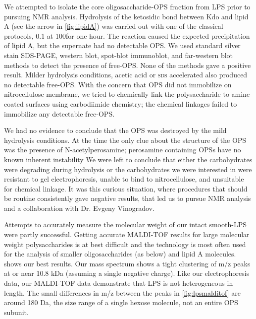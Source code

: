 We attempted to isolate the core oligosaccharide-\ac{OPS} fraction from \caulobacter
\ac{LPS} prior to pursuing \ac{NMR} analysis. Hydrolysis of the ketosidic bond
between Kdo and lipid A (see the arrow in \cref{fig:lipidA}) was carried out
with one of the classical protocols, 0.1 \si{\molar}  at 100\cel for one
hour. The reaction caused the expected precipitation of  lipid A, but the supernate had no detectable \ac{OPS}. We used standard silver stain \ac{SDS-PAGE}, western blot, spot-blot immunoblot, and far-western blot methods to detect the presence of free-\ac{OPS}. None of the methods gave a positive result. Milder hydrolysis conditions, acetic acid or \textsc{sds} accelerated also produced no detectable free-\ac{OPS}. With the concern that \ac{OPS} did not immobilize on nitrocellulose membrane, we tried to chemically link the polysaccharide to amine-coated surfaces using carbodiimide chemistry; the chemical linkages failed to immobilize any detectable free-\ac{OPS}. 

We had no evidence to conclude that the \ac{OPS} was destroyed by the mild hydrolysis conditions. At the time the only clue about the structure of the \ac{OPS} was the presence of N-acetylperosamine; perosamine containing \acp{OPS} have no known inherent instability We were left to conclude that either the carbohydrates were degrading during hydrolysis or the carbohydrates we were interested in were resistant to gel electrophoresis, unable to bind to nitrocellulose, and unsuitable for chemical linkage. It was this curious situation, where procedures that should be routine consistently gave negative results, that led us to pursue \ac{NMR} analysis and a collaboration with Dr. Evgeny Vinogradov.

Attempts  to accurately measure the molecular weight of our intact smooth-\ac{LPS} were partly successful. Getting accurate \ac{MALDI-TOF} results for large molecular weight polysaccharides is at best difficult and the technology is most often used for the analysis of smaller oligosaccharides (as below) and lipid A molecules.  shows our best results. Our mass spectrum shows a tight clustering of m/z peaks at or near 10.8 kDa (assuming a single negative charge). Like our electrophoresis data, our \ac{MALDI-TOF} data demonstrate that \caulobacter{} \ac{LPS} is not heterogeneous in length. The small differences in m/z between the peaks in \cref{fig:lpsmalditof} are around 180 Da, the size range of a single hexose molecule, not an entire \ac{OPS} subunit.

